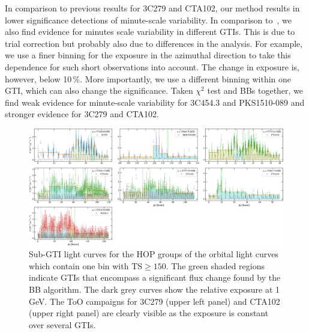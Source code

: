 \documentclass[twocolumn,linenumbers]{aastex62}
\begin{document}
In comparison to previous results for 3C279 and CTA102, our method results in lower significance detections of minute-scale variability.
In comparison to~\citet{2018ApJ...854L..26S}, we also find evidence for minutes scale variability in different GTIs. 
This is due to trial correction but probably also due to differences in the analysis.
For example, we use a finer binning for the exposure in the azimuthal direction to take this dependence for such short observations into account.
The change in exposure is, however, below 10\,\%.
More importantly, we use a different binning within one GTI, which can also change the significance. 
Taken $\chi^2$ test and BBs together, we find weak evidence for minute-scale variability for 3C454.3 and PKS1510-089 and stronger evidence for 3C279 and CTA102.
\begin{figure}
    \centering
    \includegraphics[width = .9\linewidth]{figures/lc_minute_3min.pdf}
    \caption{Sub-GTI light curves for the HOP groups of the orbital light curves which contain one bin with $\mathrm{TS} \geqslant 150$. The green shaded regions indicate GTIs that encompass a significant flux change found by the BB algorithm. The dark grey curves show the relative exposure at 1\,GeV. The ToO campaigns for 3C279 (upper left panel) and CTA102 (upper right panel) are clearly visible as the exposure is constant over several GTIs. }
    \label{fig:lc_minutes}
\end{figure}
\end{document}
